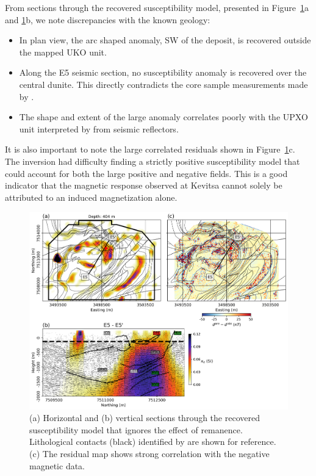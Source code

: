 \documentclass[paper]{geophysics}
\begin{document}
From sections through the recovered susceptibility model, presented in Figure~\ref{MAG_lp_EW}a and \ref{MAG_lp_EW}b, we note discrepancies with the known geology:
\begin{itemize}
\item In plan view, the arc shaped anomaly, SW of the deposit, is recovered outside the mapped UKO unit.
\item Along the E5 seismic section, no susceptibility anomaly is recovered over the central dunite. This  directly contradicts the core sample measurements made by \cite{Montonen2012}.
\item The shape and extent of the large anomaly correlates poorly with the UPXO unit interpreted by \cite{Koivisto2015} from seismic reflectors.
\end{itemize}
It is also important to note the large correlated residuals shown in Figure~\ref{MAG_lp_EW}c. The inversion had difficulty finding a strictly positive susceptibility model that could account for both the large positive and negative fields. This is a good indicator that the magnetic response observed at Kevitsa cannot solely be attributed to an induced magnetization alone.

\begin{figure}[p!]
\includegraphics[width=\columnwidth]{Figures/Figure11.png}
\caption{(a) Horizontal and (b) vertical sections through the recovered susceptibility model that ignores the effect of remanence. Lithological contacts (black) identified by \cite{Koivisto2015} are shown for reference. (c) The residual map shows strong correlation with the negative magnetic data.}
\label{MAG_lp_EW}
\end{figure}
\end{document}
